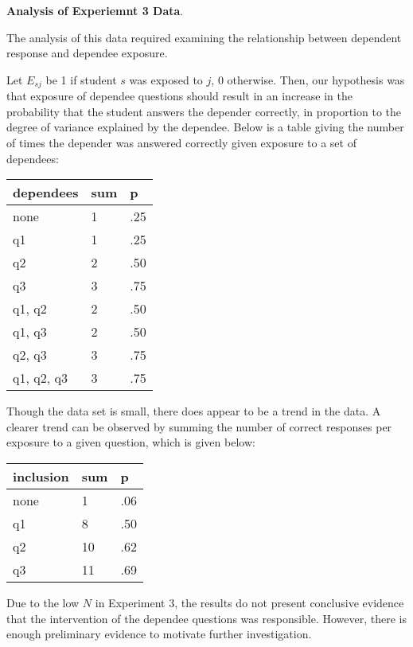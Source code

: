 \documentclass[a4paper,twocolumn]{article}
\begin{document}
\textbf{Analysis of Experiemnt 3 Data}. 

The analysis of this data required examining the relationship between
dependent response and dependee exposure.

Let $E_{sj}$ be 1 if student $s$ was exposed to $j$, 0 otherwise.  Then, our
hypothesis was that exposure of dependee questions should result in an increase
in the probability that the student answers the depender correctly, in
proportion to the degree of variance explained by the dependee.  Below is a
table giving the number of times the depender was answered correctly given
exposure to a set of dependees:

\begin{center}
\begin{tabular}{|l|l|l|}
\hline
dependees    & sum &  p   \\ \hline
none         &  1  & .25  \\ \hline
q1           &  1  & .25  \\ \hline
q2           &  2  & .50  \\ \hline
q3           &  3  & .75  \\ \hline
q1, q2       &  2  & .50  \\ \hline
q1, q3       &  2  & .50  \\ \hline
q2, q3       &  3  & .75  \\ \hline
q1, q2, q3   &  3  & .75  \\ \hline
\end{tabular}
\end{center}

Though the data set is small, there does appear to be a trend in the data. A
clearer trend can be observed by summing the number of correct responses per
exposure to a given question, which is given below:

\begin{center}
\begin{tabular}{|l|l|l|}
\hline
inclusion    & sum &  p   \\ \hline
none         &  1  & .06  \\ \hline
q1           &  8  & .50  \\ \hline
q2           & 10  & .62  \\ \hline
q3           & 11  & .69  \\ \hline
\end{tabular}
\end{center}

Due to the low $N$ in Experiment 3, the results do not present conclusive
evidence that the intervention of the dependee questions was responsible.
However, there is enough preliminary evidence to motivate further
investigation.  
\end{document}
